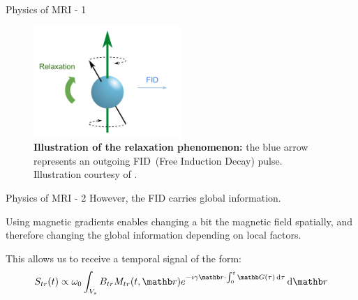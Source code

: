 \documentclass[aspectratio=169,xcolor=dvipsnames]{beamer}
\begin{document}
\begin{frame}{Physics of MRI - 1}
{\begin{figure}
        \includegraphics[width=0.5\textwidth]{Figures/intro_figures/Relaxation.pdf}
        \caption{\label{fig:relaxation}\textbf{Illustration of the relaxation phenomenon:} the blue arrow represents an outgoing FID~(Free Induction Decay) pulse. Illustration courtesy of \citet{wiki}.}
    \end{figure}
    }
\end{frame}

\begin{frame}{Physics of MRI - 2}
    However, the FID carries global information.
    \pause
    
    Using magnetic gradients enables changing a bit the magnetic field spatially, and therefore changing the global information depending on local factors.
    \pause
    
    This allows us to receive a temporal signal of the form:
    \begin{equation}
        S_{tr}(t) \propto \omega_0  \int_{V_s} B_{tr} M_{tr}(t, \rb) e^{-\imath \gamma \rb \cdot \int_0^t \Gb(\tau)  \dif \tau} \dif \rb 
    \end{equation}
\end{frame}
\end{document}
